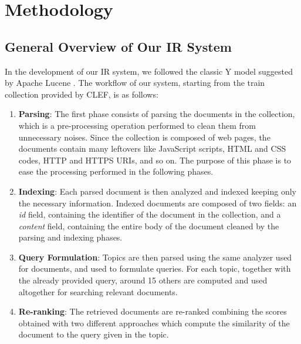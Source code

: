 \section{Methodology}
\label{sec:methodology}

\subsection{General Overview of Our IR System}
In the development of our \ac{IR} system, we followed the classic Y model suggested by Apache Lucene \cite{lucene}. The workflow of our system, starting from the train collection provided by \ac{CLEF}, is as follows:
\begin{enumerate}
    \item \textbf{Parsing}: The first phase consists of parsing the documents in the collection, which is a pre-processing operation performed to clean them from unnecessary noises. Since the collection is composed of web pages, the documents contain many leftovers like JavaScript scripts, HTML and CSS codes, HTTP and HTTPS URIs, and so on. The purpose of this phase is to ease the processing performed in the following phases.

    \item \textbf{Indexing}: Each parsed document is then analyzed and indexed keeping only the necessary information. Indexed documents are composed of two fields: an \textit{id} field, containing the identifier of the document in the collection, and a \textit{content} field, containing the entire body of the document cleaned by the parsing and indexing phases.

    \item \textbf{Query Formulation}: Topics are then parsed using the same analyzer used for documents, and used to formulate queries. For each topic, together with the already provided query, around 15 others are computed and used altogether for searching relevant documents.

    \item \textbf{Re-ranking}: The retrieved documents are re-ranked combining the scores obtained with two different approaches which compute the similarity of the document to the query given in the topic.

\end{enumerate}


